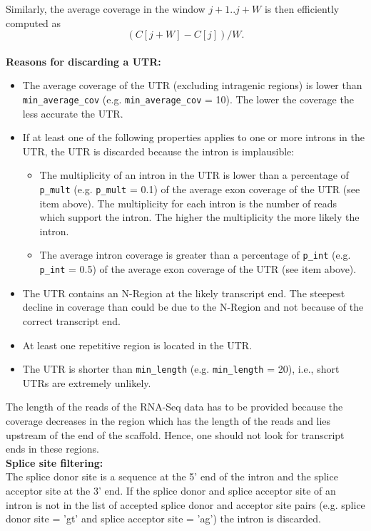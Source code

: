 \documentclass[pdftex,12pt,a4paper]{scrartcl}
\begin{document}
Similarly, the average coverage in the window $j+1..j+W$ is then efficiently computed as
\[ (C[j+W]-C[j])/W. \]
\\

\textbf{Reasons for discarding a UTR:}

\begin{itemize}
\item The average coverage of the UTR (excluding intragenic regions) is lower than \texttt{min\_average\_cov} (e.g. \texttt{min\_average\_cov} = 10). The lower the coverage the less accurate the UTR.
\item If at least one of the following properties applies to one or more introns in the UTR, the UTR is discarded because the intron is implausible:

\begin{itemize}
\item The multiplicity of an intron in the UTR is lower than a percentage of \texttt{p\_mult} (e.g. \texttt{p\_mult} = 0.1) of the average exon coverage of the UTR (see item above). The multiplicity for each intron is the number of reads which support the intron. The higher the multiplicity the more likely the intron. 
\item The average intron coverage is greater than a percentage of \texttt{p\_int} (e.g. \texttt{p\_int} = 0.5) of the average exon coverage of the UTR (see item above).
\end{itemize}

\item The UTR contains an N-Region at the likely transcript end. The steepest decline in coverage than could be due to the N-Region and not because of the correct transcript end.
\item At least one repetitive region is located in the UTR.
\item The UTR is shorter than \texttt{min\_length} (e.g. \texttt{min\_length} = 20), i.e., short UTRs are extremely unlikely.

\end{itemize}

The length of the reads of the RNA-Seq data has to be provided because the coverage decreases in the region which has the length of the reads and lies upstream of the end of the scaffold. Hence, one should not look for transcript ends in these regions.\\[2ex]


\textbf{Splice site filtering:}\\

The splice donor site is a sequence at the 5' end of the intron and the splice acceptor site at the 3' end. If the splice donor and splice acceptor site of an intron is not in the list of accepted splice donor and acceptor site pairs (e.g. splice donor site = 'gt' and splice acceptor site = 'ag') the intron is discarded.
\end{document}
